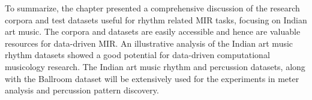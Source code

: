 To summarize, the chapter presented a comprehensive discussion of the research corpora and test datasets useful for rhythm related \gls{MIR} tasks, focusing on Indian art music. The corpora and datasets are easily accessible and hence are valuable resources for data-driven \gls{MIR}. An illustrative analysis of the Indian art music rhythm datasets showed a good potential for data-driven computational musicology research. The Indian art music rhythm and percussion datasets, along with the Ballroom dataset will be extensively used for the experiments in meter analysis and percussion pattern discovery. 
%
%
%
